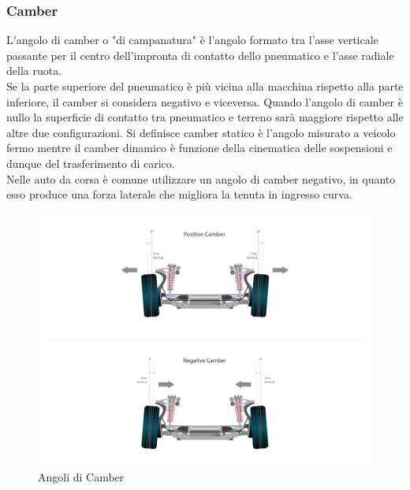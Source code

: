 \subsubsection{Camber} \label{Camber}
L'angolo di camber o "di campanatura" è l'angolo formato tra l'asse verticale passante per il centro dell'impronta di contatto dello pneumatico e l'asse radiale della ruota.\\
Se la parte superiore del pneumatico è più vicina alla macchina rispetto alla parte inferiore, il camber si considera negativo e viceversa.
Quando l'angolo di camber è nullo la superficie di contatto tra pneumatico e terreno sarà maggiore rispetto alle altre due configurazioni.
Si definisce camber statico è l'angolo misurato a veicolo fermo mentre il camber dinamico è funzione della cinematica delle sospensioni e dunque del trasferimento di carico.\\
Nelle auto da corsa è comune utilizzare un angolo di camber negativo, in quanto esso produce una forza laterale che migliora la tenuta in ingresso curva.

\begin{figure}[ht]
    \centering
    \includegraphics[scale=0.4]{Immagini/Lateral dynamics/Camber.jpg}
    \caption{Angoli di Camber}
    \label{fig:Camber}
\end{figure}



